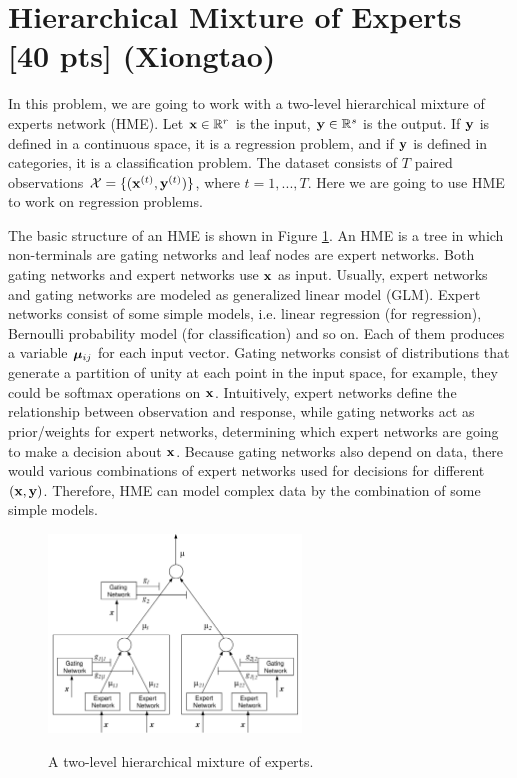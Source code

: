 \newcommand\independent{\protect\mathpalette{\protect\independenT}{\perp}}
\def\independenT#1#2{\mathrel{\rlap{$#1#2$}\mkern2mu{#1#2}}}

\section{Hierarchical Mixture of Experts [40 pts] (Xiongtao)}

\noindent
In this problem, we are going to work with a two-level hierarchical mixture of experts network (HME). Let
$\mathbf{x} \in \mathbb{R}^{r}$ is the input, $\mathbf{y}\in \mathbb{R}^{s}$ is the output. If $\mathbf{y}$ is defined in a continuous space, it is a regression problem, and if $\mathbf{y}$ is defined in categories, it is a classification problem. The dataset consists of $T$ paired observations $\mathcal{X} = \{(\mathbf{x}^{(t)}, \mathbf{y}^{(t)})\}$, where $t=1, ..., T$. Here we are going to use HME to work on regression problems.

The basic structure of an HME is shown in Figure \ref{fig:hme}. An HME is a tree in which non-terminals are gating networks and leaf nodes are expert networks. Both gating networks and expert networks use $\mathbf{x}$ as input. Usually, expert networks and gating networks are modeled as generalized linear model (GLM). Expert networks consist of some simple models, i.e. linear regression (for regression), Bernoulli probability model (for classification) and so on. Each of them produces a variable $\boldsymbol \mu_{ij}$ for each input vector. Gating networks consist of distributions that generate a partition of unity at each point in the input space, for example, they could be softmax operations on $\mathbf{x}$. Intuitively, expert networks define the relationship between observation and response, while gating networks act as prior/weights for expert networks, determining which expert networks are going to make a decision about $\mathbf{x}$. Because gating networks also depend on data, there would various combinations of expert networks used for decisions for different $(\mathbf{x}, \mathbf{y})$. Therefore, HME can model complex data by the combination of some simple models. 
	
\begin{figure}[!ht]
	\centering
	\includegraphics[width=0.6\textwidth]{figures/2_layer_HME.png}\\
	\caption{A two-level hierarchical mixture of experts.}
	\label{fig:hme}
\end{figure}


